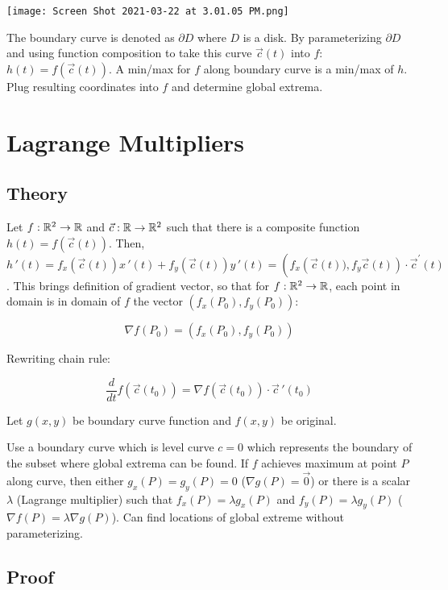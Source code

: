 \begin{center}
    \texttt{[image: Screen Shot 2021-03-22 at 3.01.05 PM.png]}
\end{center}

The boundary curve is denoted as $\partial D$ where $D$ is a disk. By parameterizing $\partial D$ and using function
composition to take this curve $\vec{c}(t)$ into $f$: $h(t)=f(\vec{c}(t))$. A min/max for $f$ along boundary curve
is a min/max of $h$. Plug resulting coordinates into $f$ and determine global extrema.

\section{Lagrange Multipliers}

\subsection{Theory}

Let $f:\mathbb{R}^2\rightarrow \mathbb{R}$ and $\vec{c}:\mathbb{R}\rightarrow \mathbb{R}^2$ such that there is a composite function $h(t)=f(\vec{c}(t))$.
Then, $h\,'(t)=f_x(\vec{c}(t))x\,'(t)+f_y(\vec{c}(t))y\,'(t)=\left(f_{x}\left(\vec{c}(t)), f_{y} \vec{c}(t)\right) \cdot \vec{c}^{\prime}(t)\right.$.
This brings definition of gradient vector, so that for $f:\mathbb{R}^2\rightarrow \mathbb{R}$, each point in domain is in domain of $f$ the vector $\left(f_{x}\left(P_{0}\right), f_{y}\left(P_{0}\right)\right)$:

\[\nabla f\left(P_{0}\right)=\left(f_{x}\left(P_{0}\right), f_{y}\left(P_{0}\right)\right)\]

Rewriting chain rule:

\[\frac{d}{dt}f(\vec{c}(t_0))=\nabla f(\vec{c}(t_0))\cdot \vec{c}\,'(t_0)\]

Let $g(x,y)$ be boundary curve function and $f(x,y)$ be original.

Use a boundary curve which is level curve $c=0$ which represents the boundary of the subset where global extrema can be found. 
If $f$ achieves maximum at point $P$ along curve, then either $g_x(P)=g_y(P)=0$ ($\nabla g(P)=\vec{0}$) or there is a scalar $\lambda$ (Lagrange multiplier)
such that $f_x(P)=\lambda g_x(P)$ and $f_y(P)=\lambda g_y(P)$ ($\nabla f(P)=\lambda \nabla g(P)$). Can find locations of global extreme without parameterizing.

\subsection{Proof}

